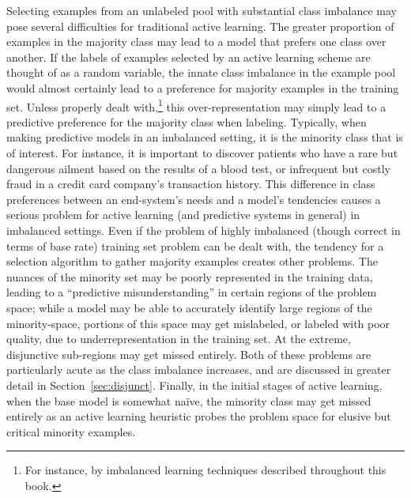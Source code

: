 Selecting examples from an unlabeled pool with substantial class imbalance may pose several difficulties for traditional active learning. The greater proportion of examples in the majority class may lead to a model that prefers one class over another. If the labels of examples selected by an active learning scheme are thought of as a random variable, the innate class imbalance in the example pool would almost certainly lead to a preference for majority examples in the training set. Unless properly dealt with,\footnote{For instance, by imbalanced learning techniques described throughout this book.} this over-representation may simply lead to a predictive preference for the majority class when labeling. Typically, when making predictive models in an imbalanced setting, it is the minority class that is of interest. For instance, it is important to discover patients who have a rare but dangerous ailment based on the results of a blood test, or infrequent but costly fraud in a credit card company's transaction history. This difference in class preferences between an end-system's needs and a model's tendencies causes a serious problem for active learning (and predictive systems in general) in imbalanced settings. Even if the problem of highly imbalanced (though correct in terms of base rate) training set problem can be dealt with, the tendency for a selection algorithm to gather majority examples creates other problems. The nuances of the minority set may be poorly represented in the training data, leading to a ``predictive misunderstanding'' in certain regions of the problem space;  while a model may be able to accurately identify large regions of the minority-space, portions of this space may get mislabeled, or labeled with poor quality, due to underrepresentation in the training set. At the extreme, disjunctive sub-regions may get missed entirely. Both of these problems are particularly acute as the class imbalance increases, and are discussed in greater detail in Section~\ref{sec:disjunct}. Finally, in the initial stages of active learning, when the base model is somewhat na\"ive, the minority class may get missed entirely as an active learning heuristic probes the problem space for  elusive but critical minority examples.



